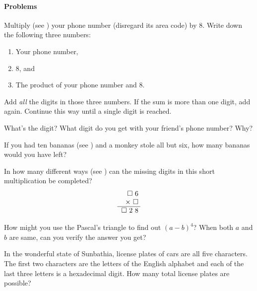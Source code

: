 \documentclass[12pt]{exam}         %
\begin{document}
\paragraph{Problems}
\begin{questions}

\question
Multiply (see \cite{martin}) your phone number (disregard its area code) by 8. Write down the following three numbers:
\begin{enumerate}
\item Your phone number,
\item 8, and
\item The product of your phone number and 8.
\end{enumerate}
Add \emph{all} the digits in those three numbers. If the sum is more than one digit, add again. Continue this way until a single digit is reached.

What's the digit? What digit do you get with your friend's phone number? Why?

\question
If you had ten bananas (see \cite{martin}) and a monkey stole all but six, how many bananas would you have left?

\question
{}

\question
In how many different ways (see \cite{eom}) can the missing digits in this short
multiplication be completed?
\begin{equation*}
\begin{tabular}{r@{\;}l@{}}
$\square$ 6  \\
$\times$ $\square$  \\
\hline
$\square$ $2$ $8$\\
\end{tabular}
\end{equation*}

\question
How might you use the Pascal's triangle to find out $(a-b)^4$? When both $a$ and $b$ are same, can you verify the answer you get?

\question
In the wonderful state of Sunbathia, license plates of cars are all five characters. The first two characters are the letters of the English alphabet and each of the last three letters is a hexadecimal digit. How many total license plates are possible?


\end{questions}
\end{document}
